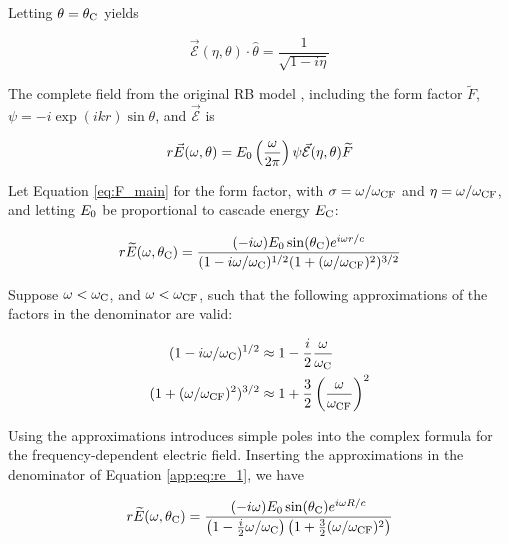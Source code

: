 \documentclass[amsmath,amssymb,aps,prd,10pt,twocolumn]{revtex4}
\begin{document}
Letting $\theta = \theta_{\rm C}$ yields

\begin{equation}
\vec{\mathcal{E}}(\eta,\theta) \cdot \hat{\theta} = \frac{1}{\sqrt{1-i\eta}}
\end{equation}

The complete field from the original RB model \cite{10.1103/physrevd.65.016003}, including the form factor $\widetilde{F}$, $\psi = -i \exp(ikr) \sin\theta$, and $\vec{\mathcal{E}}$ is 

\begin{equation}
r\vec{E}(\omega,\theta) = E_{\rm 0} \left( \frac{\omega}{2\pi} \right) \psi \vec{\mathcal{E}}(\eta,\theta) \widetilde{F} \label{app:eq:main}
\end{equation}

Let Equation \ref{eq:F_main} for the form factor, with $\sigma = \omega/\omega_{\rm CF}$ and $\eta = \omega/\omega_{\rm CF}$, and letting $E_{\rm 0}$ be proportional to cascade energy $E_{\rm C}$:

\begin{equation}
r\widetilde{E}(\omega,\theta_{\rm C}) = \frac{(-i\omega) E_0 \sin(\theta_{\rm C}) e^{i\omega r/c}}{(1-i \omega/\omega_{\rm C})^{1/2} (1+(\omega/\omega_{\rm CF})^2)^{3/2}} \label{app:eq:re_1}
\end{equation}

Suppose $\omega < \omega_{\rm C}$, and $\omega < \omega_{\rm CF}$, such that the following approximations of the factors in the denominator are valid:

\begin{align}
(1-i \omega / \omega_{\rm C})^{1/2} &\approx 1 - \frac{i}{2} \frac{\omega}{\omega_{\rm C}} \\
(1+(\omega/\omega_{\rm CF})^2)^{3/2} & \approx 1 + \frac{3}{2} \left(\frac{\omega}{\omega_{\rm CF}}\right)^2
\end{align}

Using the approximations introduces simple poles into the complex formula for the frequency-dependent electric field.  Inserting the approximations in the denominator of Equation \ref{app:eq:re_1}, we have

\begin{equation}
r\widetilde{E}(\omega,\theta_{\rm C}) = \frac{(-i\omega) E_0 \sin(\theta_{\rm C}) e^{i\omega R/c}}{\left(1-\frac{i}{2} \omega/\omega_{\rm C}\right) \left(1+\frac{3}{2}(\omega/\omega_{\rm CF})^2 \right) }
\end{equation}
\end{document}

